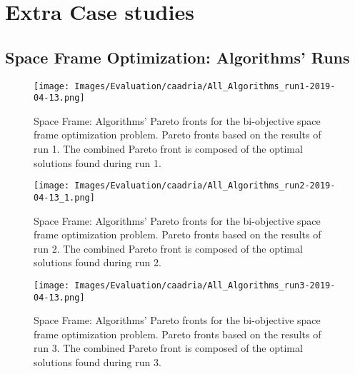 \appendix\chapter{Extra Case studies}
\label{appendix:appendixB}

\section{Space Frame Optimization: Algorithms' Runs}
\label{sec:spaceframeoptimizationextra}

\begin{figure}[htbp]
	\centering
	\texttt{[image: Images/Evaluation/caadria/All\_Algorithms\_run1-2019-04-13.png]}
	\caption[Space Frame: Pareto Fronts for run 1]{Space Frame: Algorithms' Pareto fronts for the bi-objective space frame optimization problem. Pareto fronts based on the results of run 1. The combined Pareto front is composed of the optimal solutions found during run 1.}
	\label{table:spaceframerun1}
\end{figure}


\begin{figure}[htbp]
	\centering
	\texttt{[image: Images/Evaluation/caadria/All\_Algorithms\_run2-2019-04-13\_1.png]}
	\caption[Space Frame: Pareto Fronts for run 2]{Space Frame: Algorithms' Pareto fronts for the bi-objective space frame optimization problem. Pareto fronts based on the results of run 2. The combined Pareto front is composed of the optimal solutions found during run 2.}
	\label{table:spaceframesrun2}
\end{figure}


\begin{figure}[htbp]
	\centering
	\texttt{[image: Images/Evaluation/caadria/All\_Algorithms\_run3-2019-04-13.png]}
	\caption[Space Frame: Pareto Fronts for run 3]{Space Frame: Algorithms' Pareto fronts for the bi-objective space frame optimization problem. Pareto fronts based on the results of run 3. The combined Pareto front is composed of the optimal solutions found during run 3.}
	\label{table:spaceframerun3}
\end{figure}